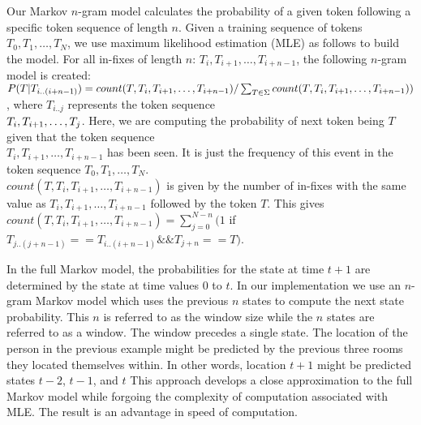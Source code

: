 Our Markov $n$-gram model calculates the probability of a given token following a specific 
token sequence of length $n$.
Given a training sequence of tokens $T_0, T_1, \dots , T_N$,
we use maximum likelihood estimation (MLE) as follows to build the model.
For all in-fixes of
length $n$: $T_i, T_{i+1}, \dots , T_{i+n-1}$,
the following $n$-gram model is created:
$P(T | T_{i..(i+n-1)}) =  count(T, T_i, T_{i+1}, \dots , T_{i+n-1})/\sum_{T \in \Sigma} count(
T, T_i, T_{i+1}, \dots , \\T_{i+n-1}))$, where $T_{i..j}$ represents the
token sequence \\
$T_i, T_{i+\\1}, \dots, T_j$.
Here, we are computing the probability of next token being $T$
given that the token sequence \\
$T_i, T_{i+1}, \dots , T_{i+n-1}$ has been seen.
It is just the
frequency of this event in the token sequence $T_0, T_1, \dots , T_N$. \\
$count(T, T_i, T_{i+1}, \dots , T_{i+n-1})$ is given by the number of in-fixes with the same value as
$T_i, T_{i+1}, \dots , T_{i+n-1}$ followed by the token $T$. This gives 
$count(T, T_i, T_{i+1}, \dots , T_{i+n-1}) = \sum_{j=0}^{N-n}(1$ if $T_{j..(j+n-1)} == T_{i..(i+n-1)} \&\&
T_{j+n} == T)$.

In the full Markov model,
the probabilities for the state at time $t+1$
are determined by the state at time values $0$ to $t$.
In our implementation we use an
$n$-gram Markov model which uses the
previous $n$ states to compute the
next state probability.
This $n$ is referred to as the window size
while the $n$ states are
referred to as a window.
The window precedes a single state.
%
The location of the person in the
previous example might be predicted by
the previous three rooms they located
themselves within.
In other words,
location $t+1$ might be predicted
states $t-2$, $t-1$, and $t$
%
This approach develops a close approximation
to the full Markov model while
forgoing the complexity of computation
associated with MLE.
The result is an advantage in 
speed of computation.

